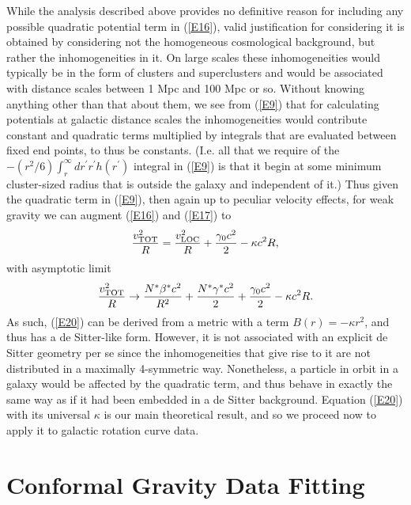 \documentclass[preprint,aps]{revtex4}
\begin{document}
While the analysis described above provides no definitive reason for including any possible quadratic  potential term in (\ref{E16}), valid justification for considering it is obtained by considering not the homogeneous cosmological background, but rather the inhomogeneities in it. On large scales these inhomogeneities would typically be in the form of clusters and superclusters and would be associated with distance scales between 1 Mpc and 100 Mpc or so. Without knowing anything other than that about them, we see from (\ref{E9}) that  for calculating potentials at galactic distance scales the inhomogeneities would contribute constant and quadratic terms multiplied by integrals that are evaluated between fixed end points, to thus be constants. (I.e. all that we require of the  $-(r^2/6)\int_r^{\infty} dr^{\prime}r^{\prime }h(r^{\prime})$ integral in (\ref{E9}) is that it begin at some minimum cluster-sized radius that is outside the galaxy and independent of it.) Thus given the quadratic term in (\ref{E9}), then again up to peculiar velocity effects, for weak gravity we can augment (\ref{E16}) and (\ref{E17}) to 
%                                                                               
\begin{equation}
\frac{v^2_{\rm TOT}}{R}=\frac{v^2_{\rm LOC}}{R}+\frac{\gamma_0 c^2}{2}-\kappa c^2R,
\label{E20}
\end{equation}                                 
%
with asymptotic limit 
% 
\begin{equation}
\frac{v_{{\rm TOT}}^2}{R} \rightarrow \frac{N^*\beta^*c^2}{R^2}+
\frac{N^*\gamma^*c^2}{2}+\frac{\gamma_0c^2}{2}-\kappa c^2R.
\label{E21}
\end{equation} 
%
As such, (\ref{E20}) can be derived from a metric with a term $B(r)=-\kappa r^2$, and thus has a de Sitter-like form. However, it is not associated with an explicit de Sitter geometry per se since the inhomogeneities that give rise to it are not distributed in a maximally 4-symmetric way. 
Nonetheless, a particle in orbit in a galaxy would be affected by the quadratic term, and thus behave in exactly the same way as if it had been embedded in a de Sitter background. Equation (\ref{E20}) with its universal $\kappa$ is our main theoretical result, and so we proceed now to apply it to galactic rotation curve data.

\section{Conformal Gravity Data Fitting}
\label{s4}
\end{document}
